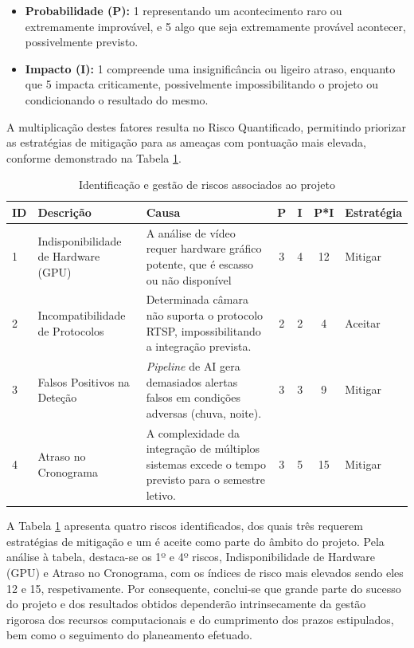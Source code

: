 \begin{itemize}
    \item \textbf{Probabilidade (P):} 1 representando um acontecimento raro ou extremamente improvável, e 5 algo que seja extremamente provável acontecer, possivelmente previsto.
    \item \textbf{Impacto (I):} 1 compreende uma insignificância ou ligeiro atraso, enquanto que 5 impacta criticamente, possivelmente impossibilitando o projeto ou condicionando o resultado do mesmo.
\end{itemize}

A multiplicação destes fatores resulta no Risco Quantificado, permitindo priorizar as estratégias de mitigação para as ameaças com pontuação mais elevada, conforme demonstrado na Tabela \ref{tab:riscos}.

\begin{table}[H]
\centering
\caption{Identificação e gestão de riscos associados ao projeto}
\label{tab:riscos}
\begin{tabular}{lp{3cm}p{4cm}cccp{2.5cm}}
\toprule
\textbf{ID} & \textbf{Descrição} & \textbf{Causa} & \textbf{P} & \textbf{I} & \textbf{P*I} & \textbf{Estratégia} \\
\midrule
1 & Indisponibilidade de Hardware (\gls{GPU}) & A análise de vídeo requer hardware gráfico potente, que é escasso ou não disponível & 3 & 4 & 12 & Mitigar \\
2 & Incompatibilidade de Protocolos & Determinada câmara não suporta o protocolo \gls{RTSP}, impossibilitando a integração prevista. & 2 & 2 & 4 & Aceitar \\
3 & Falsos Positivos na Deteção & \textit{Pipeline} de \gls{AI} gera demasiados alertas falsos em condições adversas (chuva, noite). & 3 & 3 & 9 & Mitigar \\
4 & Atraso no Cronograma & A complexidade da integração de múltiplos sistemas excede o tempo previsto para o semestre letivo. & 3 & 5 & 15 & Mitigar \\
\bottomrule
\end{tabular}
\end{table}

A Tabela \ref{tab:riscos} apresenta quatro riscos identificados, dos quais três requerem estratégias de mitigação e um é aceite como parte do âmbito do projeto. Pela análise à tabela, destaca-se os 1º e 4º riscos, Indisponibilidade de Hardware (\gls{GPU}) e Atraso no Cronograma, com os índices de risco mais elevados sendo eles 12 e 15, respetivamente. Por consequente, conclui-se que grande parte do sucesso do projeto e dos resultados obtidos dependerão intrinsecamente da gestão rigorosa dos recursos computacionais e do cumprimento dos prazos estipulados, bem como o seguimento do planeamento efetuado.

